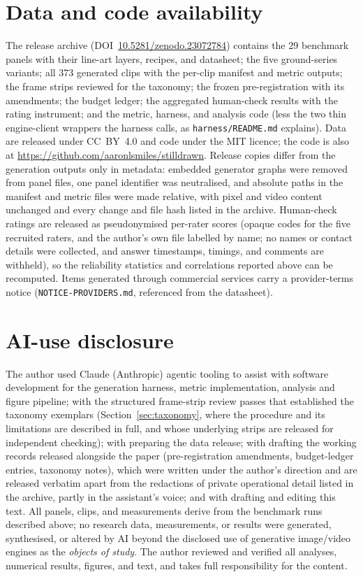 \documentclass[11pt]{article}
\newcommand{\datadoi}{\href{https://doi.org/10.5281/zenodo.23072784}{10.5281/zenodo.23072784}}
\newcommand{\coderepo}{\url{https://github.com/aaronlsmiles/stilldrawn}}
\begin{document}
\section*{Data and code availability}
The release archive (DOI~\datadoi) contains the 29 benchmark panels with
their line-art layers, recipes, and datasheet; the five ground-series
variants; all 373 generated clips with the per-clip manifest and metric
outputs; the frame strips reviewed for the taxonomy; the frozen
pre-registration with its amendments; the budget ledger; the aggregated
human-check results with the rating instrument; and the metric, harness, and
analysis code (less the two thin engine-client wrappers the harness calls, as
\texttt{harness/README.md} explains). Data are released under CC~BY~4.0 and code under the MIT
licence; the code is also at \coderepo. Release copies differ from the
generation outputs only in metadata: embedded generator graphs were removed
from panel files, one panel identifier was neutralised, and absolute paths in
the manifest and metric files were made relative, with pixel and
video content unchanged and every change and file hash listed in the
archive. Human-check ratings are released as pseudonymised per-rater scores (opaque
codes for the five recruited raters, and the author's own file labelled by
name; no names or contact details were collected, and answer
timestamps, timings, and comments are withheld), so the reliability statistics
and correlations reported above can be recomputed. Items generated through commercial
services carry a provider-terms notice (\texttt{NOTICE-PROVIDERS.md}, referenced
from the datasheet).

\section*{AI-use disclosure}
The author used Claude (Anthropic) agentic tooling to assist with software
development for the generation harness, metric implementation, analysis and
figure pipeline; with the structured frame-strip review passes that
established the taxonomy exemplars (Section~\ref{sec:taxonomy}, where the
procedure and its limitations are described in full, and whose underlying
strips are released for independent checking); with preparing the data
release; with drafting the working records released alongside the paper
(pre-registration amendments, budget-ledger entries, taxonomy notes), which
were written under the author's direction and are released verbatim apart
from the redactions of private operational detail listed in the archive, partly
in the assistant's voice; and with drafting and editing this text. All
panels, clips,
and measurements derive from the benchmark runs described above; no research
data, measurements, or results were generated, synthesised, or altered by AI
beyond the disclosed use of generative image/video engines as the
\emph{objects of study}. The author reviewed and verified all analyses,
numerical results, figures, and text, and takes full responsibility for the
content.



\end{document}
